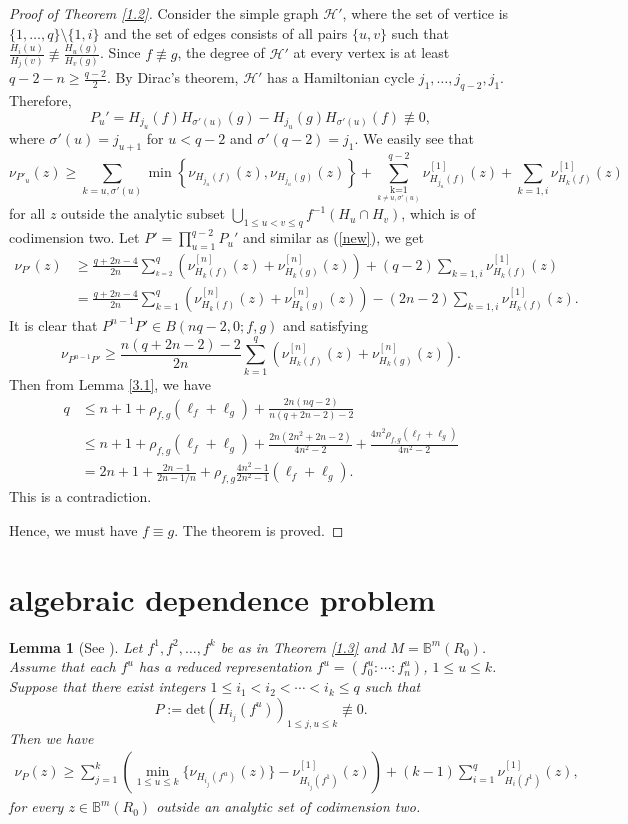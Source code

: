 \documentclass[12pt, a4paper, oneside]{amsart}
\def\overset#1#2{{\mathrel{\mathop {{#2}_{}}\limits^{#1}}}}
\def\underset#1#2{{\mathrel{\mathop {{}_{} {#2}}\limits_{{#1}_{}}}}}
\newtheorem{lemma}[equation]{Lemma}
\newcommand{\B}{\mathbb{B}}
\numberwithin{equation}{section}
\begin{document}
\begin{proof}[Proof of Theorem \ref{1.2}]
Consider the simple graph $\mathcal H'$, where the set of vertice is $\{1,\ldots,q\}\setminus\{1,i\}$ and the set of edges consists of all pairs $\{u,v\}$ such that $\frac{H_i(u)}{H_j(v)}\not\equiv\frac{H_u(g)}{H_v(g)}$. Since $f\not\equiv g$, the degree of $\mathcal H'$ at every vertex is at least $q-2-n\ge\frac{q-2}{2}$. By Dirac's theorem, $\mathcal H'$ has a Hamiltonian cycle $j_1,\ldots,j_{q-2},j_1$. Therefore, 
$$P_{u}'=H_{j_u}(f) H_{\sigma'(u)}(g)-H_{j_u}(g) H_{\sigma'(u)}(f)\not\equiv 0,$$
where $\sigma'(u)=j_{u+1}$ for $u<q-2$ and $\sigma'(q-2)=j_1$. We easily see that 
$$\nu_{P'_u}(z)\geq \sum_{k=u,\sigma'(u)}\min \left\{\nu_{H_{j_u}(f)}(z), \nu_{H_{j_u}(g)}(z)\right\}+\sum_{\underset{k\ne u,\sigma'(u)}{k=1}}^{q-2}\nu^{[1]}_{H_{j_u}(f)}(z)+\sum_{k=1,i}\nu^{[1]}_{H_k(f)}(z)$$
for all $z$ outside the analytic subset $\bigcup_{1\le u<v\le q}f^{-1}(H_u\cap H_v)$, which is of codimension two. Let $P'=\prod_{u=1}^{q-2}P_u'$ and similar as (\ref{new}), we get
\begin{align*}
\nu_{P'}(z) &\ge\frac{q+2n-4}{2n}\sum_{\overset{k=2}{k\ne i}}^q\left (\nu_{H_k(f)}^{[n]}(z)+\nu_{H_k(g)}^{[n]}(z)\right )+(q-2)\sum_{k=1,i}\nu_{H_k(f)}^{[1]}(z)\\
&=\frac{q+2n-4}{2n}\sum_{k=1}^q\left (\nu_{H_k(f)}^{[n]}(z)+\nu_{H_k(g)}^{[n]}(z)\right )-(2n-2)\sum_{k=1,i}\nu_{H_k(f)}^{[1]}(z).
\end{align*}
It is clear that $P^{n-1}P'\in B(nq-2,0;f,g)$ and satisfying
$$ \nu_{P^{n-1}P'}\ge\frac{n(q+2n-2)-2}{2n}\sum_{k=1}^{q}\left (\nu_{H_k(f)}^{[n]}(z)+\nu_{H_k(g)}^{[n]}(z)\right ).$$
Then from Lemma \ref{3.1}, we have
\begin{align*}
q&\le n+1+\rho_{f,g}(\ell_f+\ell_g)+ \frac{2n(nq-2)}{n(q+2n-2)-2}\\
&\le n+1+\rho_{f,g}(\ell_f+\ell_g)+\frac{2n(2n^2+2n-2)}{4n^2-2}+\frac{4n^2\rho_{f,g}(\ell_f+\ell_g)}{4n^2-2}\\
&=2n+1+\frac{2n-1}{2n-1/n}+\rho_{f,g}\frac{4n^2-1}{2n^2-1}(\ell_f+\ell_g).
\end{align*}
This is a contradiction. 

Hence, we must have $f\equiv g$. The theorem is proved. 
\end{proof}

\section{algebraic dependence problem}
\begin{lemma}[{See  \cite[Lemma 3.1]{Q22}}]\label{5.1}
Let $f^1,f^2,\ldots,f^k$ be as in Theorem \ref{1.3} and $M=\B^m(R_0)$. Assume that each $f^u$ has a reduced representation $f^u=(f^u_{0}:\cdots :f^u_{n})$, $1\le u\le k$. Suppose that there exist integers $1\le i_1<i_2<\cdots <i_k\le q$ such that
$$ P:=\mathrm{det}\left(H_{i_j}(f^u)\right)_{1\le j,u\le k}\not\equiv 0.$$
Then we have
\begin{align*}
\nu_P (z)\ge\sum_{j=1}^k\left(\min_{1\le u\le k}\{\nu_{H_{i_j}(f^u)}(z)\}-\nu^{[1]}_{H_{i_j}(f^1)}(z)\right)+ (k-1)\sum_{i=1}^q\nu^{[1]}_{H_{i}(f^1)}(z),
\end{align*}
for every $z\in\B^m(R_0)$ outside an analytic set of codimension two.
\end{lemma}
\end{document}
